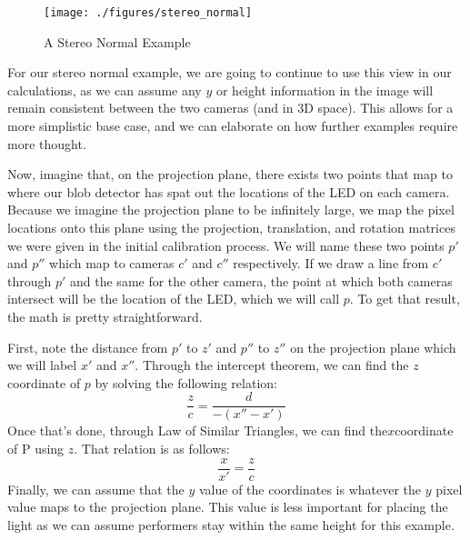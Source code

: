 \documentclass[
    12pt,
    twoside,
    bibstyle=chicago,
    headerstyle=uppercase,
	bibfile=thesis_updating.bib
]{reedthesis}
\begin{document}
	\begin{figure}[h]
	   
	       \centering
	        
	    \texttt{[image: ./figures/stereo\_normal]}
	     \caption{A Stereo Normal Example}
	 \label{A Stereo Normal Example}
	\end{figure}

For our stereo normal example, we are going to continue to use this view in our calculations, as we can assume any $y$ or height information in the image will remain consistent between the two cameras (and in 3D space). This allows for a more simplistic base case, and we can elaborate on how further examples require more thought.

Now, imagine that, on the projection plane, there exists two points that map to where our blob detector has spat out the locations of the LED on each camera. Because we imagine the projection plane to be infinitely large, we map the pixel locations onto this plane using the projection, translation, and rotation matrices we were given in the initial calibration process. We will name these two points $p'$ and $p''$ which map to cameras $c'$ and $c''$ respectively. If we draw a line from $c'$ through $p'$ and the same for the other camera, the point at which both cameras intersect will be the location of the LED, which we will call $p$. To get that result, the math is pretty straightforward.

First, note the distance from $p'$ to $z'$ and $p''$ to $z''$ on the projection plane which we will label $x'$ and $x''$. Through the intercept theorem, we can find the $z$ coordinate of $p$ by solving the following relation:
\[\frac{z}{c} = \frac{d}{-(x'' - x')}\]
Once that's done, through Law of Similar Triangles, we can find the$x$coordinate of P using $z$. That relation is as follows:
\[\frac{x}{x'}=\frac{z}{c}\]
Finally, we can assume that the $y$ value of the coordinates is whatever the $y$ pixel value maps to the projection plane. This value is less important for placing the light as we can assume performers stay within the same height for this example.
\end{document}
